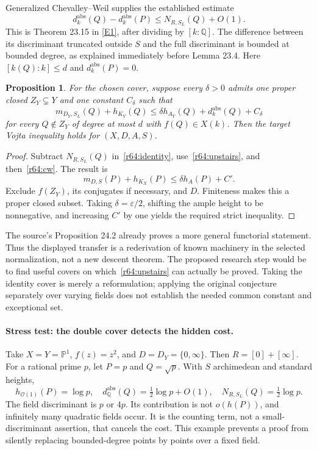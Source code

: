 \documentclass[11pt,a4paper]{article}
\newcommand{\Q}{\mathbb{Q}}
\newcommand{\PP}{\mathbb P}
\newcommand{\eps}{\varepsilon}
\newcommand{\eref}[2]{\hyperlink{extra:#1:#2}{[E#2]}}
\newtheorem{notebookproposition}[notebooklemma]{Proposition}
\numberwithin{equation}{section}
\begin{document}
Generalized Chevalley--Weil supplies the established estimate
\begin{equation}\label{r64:cw}
 d_k^{\mathrm{abs}}(Q)-d_k^{\mathrm{abs}}(P)
       \le N_{R,S_L}(Q)+O(1).
\end{equation}
This is Theorem 23.15 in \eref{30005098}{1}, after dividing by $[k:\Q]$. The difference between its discriminant truncated outside $S$ and the full discriminant is bounded at bounded degree, as explained immediately before Lemma 23.4. Here $[k(Q):k]\le d$ and $d_k^{\mathrm{abs}}(P)=0$.

\begin{notebookproposition}\label{r64:descent}
For the chosen cover, suppose every $\delta>0$ admits one proper closed $Z_Y\subsetneq Y$ and one constant $C_\delta$ such that
\begin{equation}\label{r64:upstairs}
 m_{D_Y,S_L}(Q)+h_{K_Y}(Q)
 \le\delta h_{A_Y}(Q)+d_k^{\mathrm{abs}}(Q)+C_\delta
\end{equation}
for every $Q\notin Z_Y$ of degree at most $d$ with $f(Q)\in X(k)$. Then the target Vojta inequality holds for $(X,D,A,S)$.
\end{notebookproposition}
\begin{proof}
Subtract $N_{R,S_L}(Q)$ in~\eqref{r64:identity}, use~\eqref{r64:upstairs}, and then~\eqref{r64:cw}. The result is
\[
 m_{D,S}(P)+h_{K_X}(P)\le\delta h_A(P)+C'.
\]
Exclude $f(Z_Y)$, its conjugates if necessary, and $D$. Finiteness makes this a proper closed subset. Taking $\delta=\eps/2$, shifting the ample height to be nonnegative, and increasing $C'$ by one yields the required strict inequality.
\end{proof}

The source's Proposition 24.2 already proves a more general functorial statement. Thus the displayed transfer is a rederivation of known machinery in the selected normalization, not a new descent theorem. The proposed research step would be to find useful covers on which~\eqref{r64:upstairs} can actually be proved. Taking the identity cover is merely a reformulation; applying the original conjecture separately over varying fields does not establish the needed common constant and exceptional set.

\paragraph{Stress test: the double cover detects the hidden cost.}
Take $X=Y=\PP^1$, $f(z)=z^2$, and $D=D_Y=\{0,\infty\}$. Then $R=[0]+[\infty]$. For a rational prime $p$, let $P=p$ and $Q=\sqrt p$. With $S$ archimedean and standard heights,
\[
 h_{\mathcal O(1)}(P)=\log p,\quad
 d_{\Q}^{\mathrm{abs}}(Q)=\tfrac12\log p+O(1),\quad
 N_{R,S_L}(Q)=\tfrac12\log p.
\]
The field discriminant is $p$ or $4p$. Its contribution is not $o(h(P))$, and infinitely many quadratic fields occur. It is the counting term, not a small-discriminant assertion, that cancels the cost. This example prevents a proof from silently replacing bounded-degree points by points over a fixed field.
\end{document}
